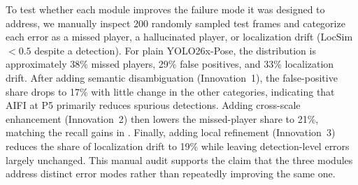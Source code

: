 To test whether each module improves the failure mode it was designed to address, we manually inspect 200 randomly sampled test frames and categorize each error as a missed player, a hallucinated player, or localization drift (LocSim $< 0.5$ despite a detection). For plain YOLO26x-Pose, the distribution is approximately 38\% missed players, 29\% false positives, and 33\% localization drift. After adding semantic disambiguation (Innovation~1), the false-positive share drops to 17\% with little change in the other categories, indicating that AIFI at P5 primarily reduces spurious detections. Adding cross-scale enhancement (Innovation~2) then lowers the missed-player share to 21\%, matching the recall gains in . Finally, adding local refinement (Innovation~3) reduces the share of localization drift to 19\% while leaving detection-level errors largely unchanged. This manual audit supports the claim that the three modules address distinct error modes rather than repeatedly improving the same one.
